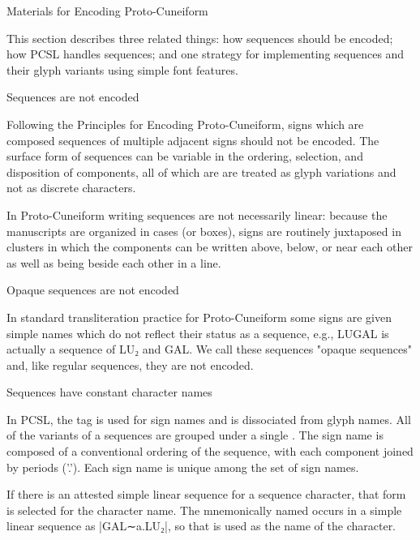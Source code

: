 \ten\rm

\Hh\title{}Materials for Encoding Proto-Cuneiform



\par This section describes three related things: how sequences
      should be encoded; how PCSL handles sequences; and one strategy
      for implementing sequences and their glyph variants using simple
      font features.

\Hh{}Sequences are not encoded


\par Following the Principles for Encoding Proto-Cuneiform, signs
      which are composed sequences of multiple adjacent signs should
      not be encoded.  The surface form of sequences can be variable
      in the ordering, selection, and disposition of components, all
      of which are are treated as glyph variations and not as discrete
      characters.


\par In Proto-Cuneiform writing sequences are not
      necessarily linear: because the manuscripts are organized in
      cases (or boxes), signs are routinely juxtaposed in clusters in
      which the components can be written above, below, or near each
      other as well as being beside each other in a line.

\Hhh{}Opaque sequences are not encoded


\par In standard transliteration practice for Proto-Cuneiform some
      signs are given simple names which do not reflect their status
      as a sequence, e.g., LUGAL is actually a sequence of LU₂ and
      GAL. We call these sequences "opaque sequences" and, like
      regular sequences, they are not encoded.

\Hh{}Sequences have constant character names


\par In PCSL, the tag  is used for sign names
      and is dissociated from glyph names.  All of the variants of a
      sequences are grouped under a single .  The
      sign name is composed of a conventional ordering of the
      sequence, with each component joined by periods ('.'). Each sign
      name is unique among the set of sign names.


\par If there is an attested simple linear sequence for a sequence
      character, that form is selected for the character name.  The
      mnemonically named  occurs in a simple linear
      sequence as |GAL∼a.LU₂|, so that is used as the name of the
      character.

